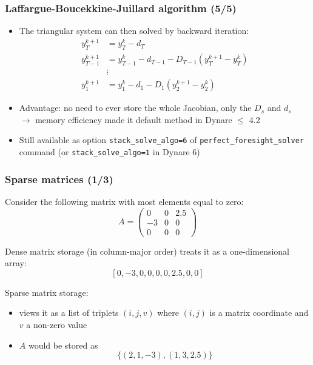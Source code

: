 \documentclass[handout,usepdftitle=false,xcolor=dvipsnames,aspectratio=169]{beamer}
\begin{document}
\begin{frame}
  \frametitle{Laffargue-Boucekkine-Juillard algorithm (5/5)}
  \begin{itemize}
    \item The triangular system can then solved by backward iteration:
          \begin{align}
            y_T^{k+1}     & = y_T^k - d_T                                      \\
            y_{T-1}^{k+1} & = y_{T-1}^k - d_{T-1} - D_{T-1}(y_T^{k+1} - y_T^k) \\
                          & \vdots                                             \\
            y_1^{k+1}     & = y_1^k - d_1 - D_1(y_2^{k+1} - y_2^k)
          \end{align}

    \item Advantage: no need to ever store the whole Jacobian, only the $D_s$ and $d_s$ \\
          $\rightarrow$ memory efficiency made it default method in Dynare $\leq$ 4.2
    \item Still available as option \texttt{stack\_solve\_algo=6} of
          \texttt{perfect\_foresight\_solver} command (or
          \texttt{stack\_solve\_algo=1} in Dynare 6)
  \end{itemize}
\end{frame}

\begin{frame}
  \frametitle{Sparse matrices (1/3)}
  \begin{witemize}
    \item Consider the following matrix with most elements equal to zero:
    \begin{equation}
      A = \left(\begin{matrix}
        0  & 0 & 2.5 \\
        -3 & 0 & 0   \\
        0  & 0 & 0
      \end{matrix}\right)
    \end{equation}
    \item Dense matrix storage (in column-major order) treats it as a
    one-dimensional array: $$[0, -3, 0, 0, 0, 0, 2.5, 0, 0]$$
    \item Sparse matrix storage:
    \begin{itemize}
      \item views it as a list of triplets $(i,j,v)$ where
            $(i,j)$ is a matrix coordinate and $v$ a non-zero value
      \item $A$ would be stored as $$\{(2,1,-3), (1,3,2.5)\}$$
    \end{itemize}
  \end{witemize}
\end{frame}
\end{document}
